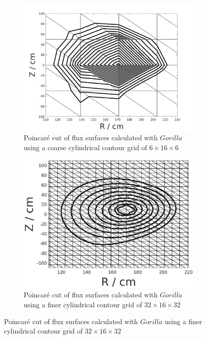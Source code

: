 \documentclass[./main.tex]{subfiles}
\begin{document}
\begin{figure}[h]
	\begin{subfigure}[b]{0.5\textwidth}
		\centering
		\includegraphics[width=\textwidth]{figures/field_lines_rect_grid.pdf}
		\captionsetup{width=1\textwidth}
		\caption{Poincar\'e cut of flux surfaces calculated with $Gorilla$ using a coarse cylindrical contour grid of $6\times16\times6$}
		\label{fig:field_lines_rect_grid}
	\end{subfigure}
	\hfill
	\begin{subfigure}[b]{0.5\textwidth}
		\includegraphics[width=\textwidth]{figures/field_lines_fine_rect_grid.eps}
		\captionsetup{width=1\textwidth}
		\caption{Poincar\'e cut of flux surfaces calculated with $Gorilla$ using a finer cylindrical contour grid of $32\times16\times32$}
		\label{fig:field_lines_fine_rect_grid}
	\end{subfigure}\hfill
\end{figure}
\end{document}
